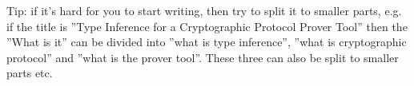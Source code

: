\documentclass[..thesis.tex]{subfiles}
\begin{document}


Tip: if it's hard for you to start writing, then try to split it to smaller parts, e.g. if the title is ''Type Inference for a Cryptographic Protocol Prover Tool'' then the ''What is it'' can be divided into ''what is type inference'', ''what is cryptographic protocol'' and ''what is the prover tool''. These three can also be split to smaller parts etc.

\end{document}
